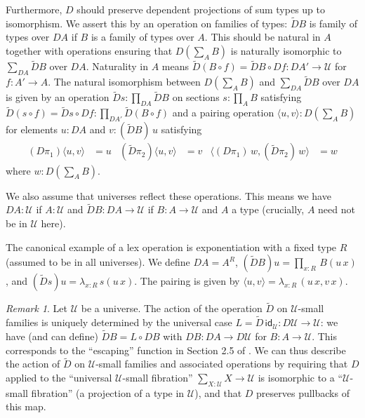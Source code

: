 \documentclass[10pt,a4paper,draft]{article}
\newcommand{\UU}{\mathcal{U}}%
\newcommand{\id}{\mathsf{id}}
\newcommand{\pairF}[2]{\langle #1,#2 \rangle}
\newcommand{\D}{D}              %
\newcommand{\DD}{\tilde{D}} %
\newcommand{\dd}{\tilde{D}} %
\renewcommand{\~}{\widetilde}
\theoremstyle{definition}
\theoremstyle{remark} %
\newtheorem{remark}[theorem]{Remark}
\begin{document}
Furthermore, $\D$ should preserve dependent projections of sum types up to isomorphism.
We assert this by an operation on families of types: $\DD B$ is family of types over $\D A$
if $B$ is a family of types over $A$.
This should be natural in $A$
together with operations ensuring that $\D(\sum_AB)$ is naturally
isomorphic to $\sum_{\D A}{\DD B}$ over $\D A$.
Naturality in $A$ means $\DD (B\circ f) = \DD B\circ \D f:\D{A'}\rightarrow\UU$ for $f:A'\rightarrow A$.
The natural isomorphism between $\D(\sum_AB)$ and $\sum_{\D A}{\DD B}$ over $\D A$ is given by
an operation $\dd s : \prod_{\D A}{\DD B}$ on sections $s:\prod_A B$
satisfying $\dd (s\circ f) = \dd s \circ \D f : \prod_{\D{A'}} \DD (B\circ f)$
and a pairing operation $\pairF{u}{v} : \D(\sum_A B)$ for elements $u:\D A$ and $v:(\DD B)\,u$
satisfying
\begin{align*}
(\D\pi_1)\pairF{u}{v} &= u &
(\dd\pi_2)\pairF{u}{v} &= v &
\pairF {(\D\pi_1)\,w}{(\dd\pi_2)\,w} &= w
\end{align*}
where $w:\D(\sum_AB)$.

We also assume that universes reflect these operations.
This means we have $\D A:\UU$ if $A:\UU$ and $\DD B:\D A\rightarrow\UU$ if $B:A\rightarrow \UU$ and $A$ a type (crucially, $A$ need not be in $\UU$ here).

\medskip

The canonical example of a lex operation is exponentiation with a fixed type $R$
(assumed to be in all universes).
We define $\D A = A^R$, $(\DD B)u = \prod_{x:R}\,B(u\,x)$, and $(\dd s)u = \lambda_{x:R}\,s(u\,x)$.
The pairing is given by $\pairF{u}{v} = \lambda_{x:R}\,(u\,x,v\,x)$.

\begin{remark}
  Let $\UU$ be a universe.
  The action of the operation $\DD$ on $\UU$\hyp{}small families is uniquely determined by the universal case $L = \DD\,\id_\UU : \D \UU \to \UU$: we have (and can define) $\DD B = L\circ \D B$ with $\D B:\D A \rightarrow \D\UU$ for $B:A\rightarrow\UU$.
  This corresponds to the ``escaping'' function in Section 2.5 of \cite{SchreiberS14}.
  We can thus describe the action of $\DD$ on $\UU$\hyp{}small families and associated operations by requiring that $\D$ applied to the ``universal $\UU$\hyp{}small fibration'' $\sum_{X:\UU} X \to \UU$ is isomorphic to a ``$\UU$\hyp{}small fibration'' (a projection of a type in $\UU$), and that $\D$ preserves pullbacks of this map.
\end{remark}
\end{document}
